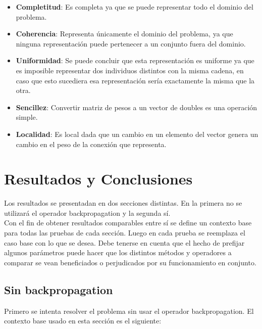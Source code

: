 \documentclass{sig-alternate}
\begin{document}
	\begin{itemize}

		\item \textbf{Completitud}: Es completa ya que se puede representar todo el dominio del problema.

		\item \textbf{Coherencia}: Representa únicamente el dominio del problema, ya que ninguna representación puede pertenecer a un conjunto fuera del dominio.

		\item \textbf{Uniformidad}: Se puede concluir que esta representación es uniforme ya que es imposible representar dos individuos distintos con la misma cadena, en caso que esto sucediera esa representación sería exactamente la misma que la otra.	

		\item \textbf{Sencillez}: Convertir matriz de pesos a un vector de doubles es una operación simple.

		\item \textbf{Localidad}: Es local dada que un cambio en un elemento
		del vector genera un cambio en el peso de la conexión que representa.

	\end{itemize}
	
\section{Resultados y Conclusiones}
	Los resultados se presentadan en dos secciones distintas.
	En la primera no se utilizará el operador backpropagation y la segunda sí. \\

	Con el fin de obtener resultados comparables entre sí se define un
	contexto base para todas las pruebas de cada sección.
	Luego en cada prueba se reemplaza el caso base con lo que se desea.
	Debe tenerse en cuenta que el hecho de prefijar algunos parámetros puede
	hacer que los distintos métodos y operadores a comparar se vean
	beneficiados o perjudicados por su funcionamiento en conjunto.


	\subsection{Sin backpropagation}
	Primero se intenta resolver el problema sin usar el operador backpropagation.
	El contexto base usado en esta sección es el siguiente:
\end{document}
